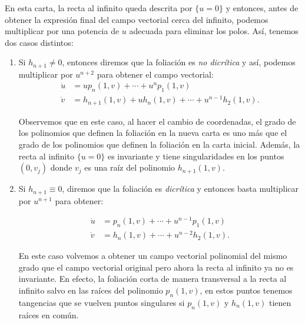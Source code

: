 En esta carta, la recta al infinito queda descrita por $\{u=0\}$ y entonces, antes de obtener la expresión final del campo vectorial cerca del infinito, podemos multiplicar por una potencia de $u$ adecuada para eliminar los polos. Así, tenemos dos casos distintos:

\begin{enumerate}

\item Si $h_{n+1}\neq 0$, entonces diremos que la foliación es \emph{no dicrítica} y así, podemos multiplicar por $u^{n+2}$ para obtener el campo vectorial:
\begin{equation}
\label{EcuacionNoDicritica}
\begin{aligned}
\dot{u} &=up_{n}(1,v)+\cdots+u^{n}p_{1}(1,v)\\
\dot{v} &=h_{n+1}(1,v)+uh_{n}(1,v)+\cdots+u^{n-1}h_{2}(1,v).
\end{aligned}
\end{equation}

Observemos que en este caso, al hacer el cambio de coordenadas, el grado de los polinomios que definen la foliación en la nueva carta es uno más que el grado de los polinomios que definen la foliación en la carta inicial. Además, la recta al infinito $\{u=0\}$ es invariante y tiene singularidades en los puntos $(0,v_{j})$ donde $v_{j}$ es una raíz del polinomio $h_{n+1}(1,v)$.

\item Si $h_{n+1}\equiv 0$, diremos que la foliación es \emph{dicrítica} y entonces basta multiplicar por $u^{n+1}$ para obtener:

\begin{equation}
\label{EcuacionDicriticaInfinito}
\begin{aligned}
\dot{u} &=p_{n}(1,v)+\cdots+u^{n-1}p_{1}(1,v)\\
\dot{v} &=h_{n}(1,v)+\cdots+u^{n-2}h_{2}(1,v).
\end{aligned}
\end{equation}

En este caso volvemos a obtener un campo vectorial polinomial del mismo grado que el campo vectorial original pero ahora la recta al infinito ya no es invariante. En efecto, la foliación corta de manera transversal a la recta al infinito salvo en las raíces del polinomio $p_{n}(1,v)$, en estos puntos tenemos tangencias que se vuelven puntos singulares si $p_{n}(1,v)$ y $h_{n}(1,v)$ tienen raíces en común.
\end{enumerate}

